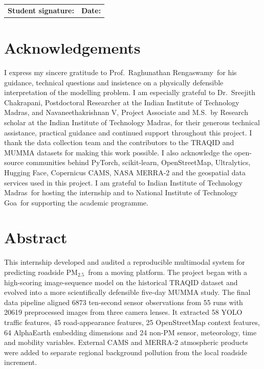 \documentclass[11pt,a4paper,oneside]{report}
\newcommand{\homeinstitution}{National Institute of Technology Goa}
\newcommand{\hostinstitution}{Indian Institute of Technology Madras}
\newcommand{\supervisor}{Prof.\ Raghunathan Rengaswamy}
\newcommand{\pmtwo}{PM$_{2.5}$}
\begin{document}
\vspace{18mm}
\begin{tabularx}{\textwidth}{X X}
  \textbf{Student signature:} \hrulefill & \textbf{Date:} \hrulefill
\end{tabularx}

\chapter*{Acknowledgements}
I express my sincere gratitude to \supervisor\ for his guidance, technical
questions and insistence on a physically defensible interpretation of the
modelling problem. I am especially grateful to Dr.\ Sreejith Chakrapani,
Postdoctoral Researcher at the Indian Institute of Technology Madras, and
Navaneethakrishnan V, Project Associate and M.S.\ by Research scholar at the
Indian Institute of Technology Madras, for their generous technical assistance,
practical guidance and continued support throughout this project. I thank the
data collection team and the contributors to the TRAQID and MUMMA datasets for
making this work possible. I also acknowledge the open-source communities
behind PyTorch, scikit-learn, OpenStreetMap, Ultralytics, Hugging Face,
Copernicus CAMS, NASA MERRA-2 and the geospatial data services used in this
project. I am grateful to \hostinstitution\ for hosting the internship and to
\homeinstitution\ for supporting the academic programme.

\chapter*{Abstract}
This internship developed and audited a reproducible multimodal system for predicting
roadside \pmtwo\ from a moving platform. The project began with a high-scoring
image-sequence model on the historical TRAQID dataset and evolved into a more
scientifically defensible five-day MUMMA study. The final data pipeline aligned
\num{6873} ten-second sensor observations from 55 runs with \num{20619}
preprocessed images from three camera lenses. It extracted 58 YOLO traffic
features, 45 road-appearance features, 25 OpenStreetMap context features, 64
AlphaEarth embedding dimensions and 24 non-PM sensor, meteorology, time and
mobility variables. External CAMS and MERRA-2 atmospheric products were added to
separate regional background pollution from the local roadside increment.
\end{document}
